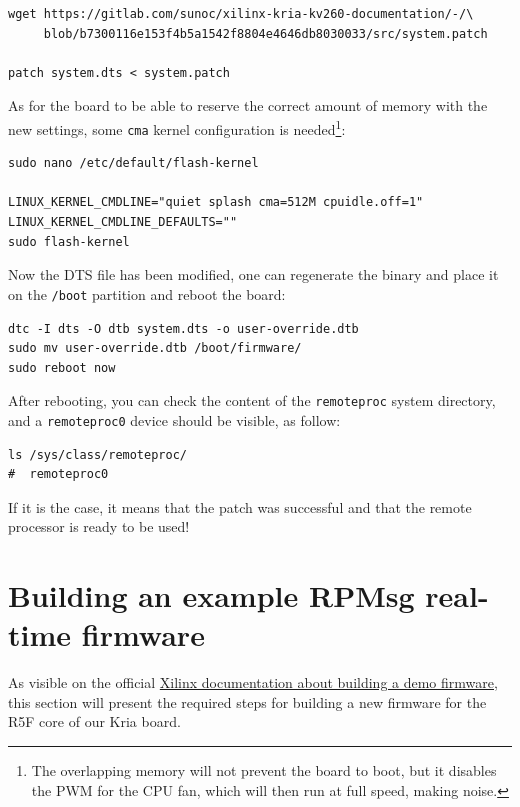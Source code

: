 \documentclass[10pt]{article}
\begin{document}
\begin{verbatim}
wget https://gitlab.com/sunoc/xilinx-kria-kv260-documentation/-/\
     blob/b7300116e153f4b5a1542f8804e4646db8030033/src/system.patch

patch system.dts < system.patch
\end{verbatim}

As for the board to be able to reserve the correct amount of memory with the new settings, some
\texttt{cma} kernel configuration is needed\footnote{The overlapping memory will not prevent the board to boot,
but it disables the PWM for the CPU fan, which will then run at full speed, making noise.}:

\begin{verbatim}
sudo nano /etc/default/flash-kernel

LINUX_KERNEL_CMDLINE="quiet splash cma=512M cpuidle.off=1"
LINUX_KERNEL_CMDLINE_DEFAULTS=""
sudo flash-kernel
\end{verbatim}

Now the DTS file has been modified, one can regenerate the binary and place it on the \texttt{/boot} partition
and reboot the board:

\begin{verbatim}
dtc -I dts -O dtb system.dts -o user-override.dtb
sudo mv user-override.dtb /boot/firmware/
sudo reboot now
\end{verbatim}

After rebooting, you can check the content of the \verb|remoteproc| system directory,
and a \texttt{remoteproc0} device should be visible, as follow:

\begin{verbatim}
ls /sys/class/remoteproc/
#  remoteproc0
\end{verbatim}

If it is the case, it means that the patch was successful and  that the remote processor is
ready to be used!
\pagebreak

\section{Building an example RPMsg real-time firmware}
\label{sec:orge6a73a7}
As visible on the official \href{https://xilinx-wiki.atlassian.net/wiki/spaces/A/pages/1837006921/OpenAMP+Base+Hardware+Configurations\\\#Build-RPU-firmware}{Xilinx documentation about building a demo firmware},
this section will present the required steps for building a new firmware for the R5F
core of our Kria board.
\end{document}
